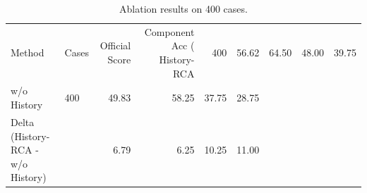 \begin{table}[t]
\centering
\caption{Ablation results on 400 cases.}
\label{tab:ablation}
\begin{tabular}{llrrrr}
\toprule
Method & Cases & Official Score & Component Acc (%
\midrule
History-RCA & 400 & 56.62 & 64.50 & 48.00 & 39.75 \\
w/o History & 400 & 49.83 & 58.25 & 37.75 & 28.75 \\
Delta (History-RCA - w/o History) &  & 6.79 & 6.25 & 10.25 & 11.00 \\
\bottomrule
\end{tabular}
\end{table}
